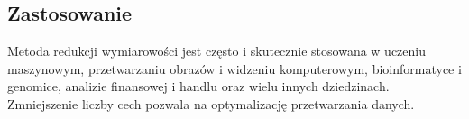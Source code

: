 	\subsection{Zastosowanie}
		Metoda redukcji wymiarowości jest często i skutecznie stosowana w uczeniu maszynowym, przetwarzaniu obrazów i widzeniu komputerowym, bioinformatyce i genomice, analizie finansowej i handlu oraz wielu innych dziedzinach. Zmniejszenie liczby cech pozwala na optymalizację przetwarzania danych.



